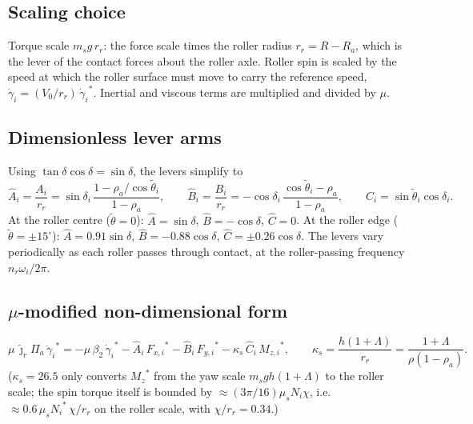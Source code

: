 \documentclass[11pt]{article}
\newcommand{\st}[1]{{#1}^{*}}
\begin{document}
\subsection{Scaling choice}
Torque scale $m_s g\,r_r$: the force scale times the roller radius
$r_r = R - R_a$, which is the lever of the contact forces about the roller axle.
Roller spin is scaled by the speed at which the roller surface must move to
carry the reference speed, $\dot\gamma_i = (V_0/r_r)\,\st{\dot\gamma_i}$.
Inertial and viscous terms are multiplied and divided by $\mu$.

\subsection{Dimensionless lever arms}
Using $\tan\delta\cos\delta = \sin\delta$, the levers simplify to
\begin{equation}
\hat A_i = \frac{A_i}{r_r} = \sin\delta_i\,\frac{1 - \rho_a/\cos\tilde\theta_i}{1-\rho_a},
\qquad
\hat B_i = \frac{B_i}{r_r} = -\cos\delta_i\,\frac{\cos\tilde\theta_i - \rho_a}{1-\rho_a},
\qquad
\hat C_i = \sin\tilde\theta_i\cos\delta_i .
\end{equation}
At the roller centre ($\tilde\theta = 0$): $\hat A = \sin\delta$,
$\hat B = -\cos\delta$, $\hat C = 0$. At the roller edge ($\tilde\theta = \pm15^\circ$):
$\hat A = 0.91\sin\delta$, $\hat B = -0.88\cos\delta$,
$\hat C = \pm0.26\cos\delta$. The levers vary periodically as each roller passes
through contact, at the roller-passing frequency $n_r\omega_i/2\pi$.

\subsection{$\mu$-modified non-dimensional form}
\begin{equation}
\mu\,\hat\jmath_r\Pi_a\,\st{\ddot\gamma_i}
 = -\mu\,\beta_2\,\st{\dot\gamma_i}
   - \hat A_i\,\st{F_{x,i}} - \hat B_i\,\st{F_{y,i}}
   - \kappa_s\,\hat C_i\,\st{M_{z,i}},
\qquad \kappa_s = \frac{h(1+\Lambda)}{r_r} = \frac{1+\Lambda}{\rho(1-\rho_a)}.
\label{eq:rollernd}
\end{equation}
($\kappa_s = 26.5$ only converts $\st{M_z}$ from the yaw scale $m_s g h(1+\Lambda)$
to the roller scale; the spin torque itself is bounded by
$\approx(3\pi/16)\mu_s N_i\chi$, i.e.\ $\approx 0.6\,\mu_s\st{N_i}\,\chi/r_r$ on the
roller scale, with $\chi/r_r = 0.34$.)
\end{document}
